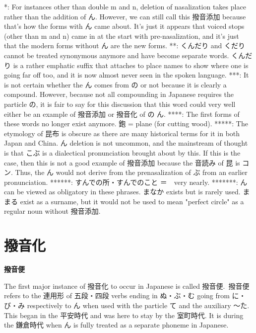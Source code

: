 \par{*: For instances other than double m and n, deletion of nasalization takes place rather than the addition of ん. However, we can still call this 撥音添加 because that's how the forms with ん came about. It's just it appears that voiced stops (other than m and n) came in at the start with pre-nasalization, and it's just that the modern forms without ん are the new forms. \hfill\break
**: くんだり and くだり　cannot be treated synonymous anymore and have become separate words. くんだり is a rather emphatic suffix that attaches to place names to show where one is going far off too, and it is now almost never seen in the spoken language. \hfill\break
***: It is not certain whether the ん comes from の or not because it is clearly a compound. However, because not all compounding in Japanese requires the particle の, it is fair to say for this discussion that this word could very well either be an example of 撥音添加 or 撥音化 of の \textrightarrow  ん.  \hfill\break
****: The first forms of these words no longer exist anymore. 鉋 = plane (for cutting wood). \hfill\break
*****: The etymology of 昆布 is obscure as there are many historical terms for it in both Japan and China. ん deletion is not uncommon, and the mainstream of thought is that こぶ is a dialectical pronunciation brought about by this. If this is the case, then this is not a good example of 撥音添加 because the 音読み of 昆 is コン. Thus, the ん would not derive from the prenasalization of ぶ from an earlier pronunciation. \hfill\break
******: すんでの所・すんでのこと ＝　very nearly. \hfill\break
*******: ん can be viewed as obligatory in these phrases. まなか exists but is rarely used. ままる exist as a surname, but it would not be used to mean "perfect circle" as a regular noun without 撥音添加. }
      
\section{撥音化}
 
\begin{center}
\textbf{撥音便 }
\end{center}

\par{ The first major instance of 撥音化 to occur in Japanese is called 撥音便. 撥音便 refers to the 連用形 of 五段・四段 verbs ending in ぬ・ぶ・む going from に・び・み respectively to ん when used with the particle て and the auxiliary ～た. This began in the 平安時代 and was here to stay by the 室町時代. It is during the 鎌倉時代 when ん is fully treated as a separate phoneme in Japanese. }

